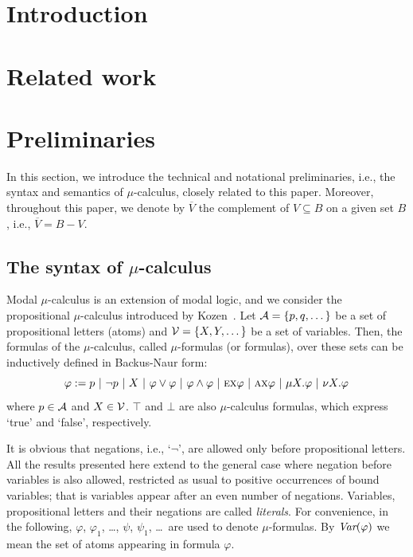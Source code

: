 \documentclass[runningheads]{llncs}
\begin{document}
\section{Introduction}


\section{Related work}

\section{Preliminaries}  \label{preliminaries}
In this section, we introduce the technical and notational preliminaries, i.e., the  syntax and semantics of $\mu$-calculus, closely related to this paper.
Moreover, throughout this paper, we denote by $\overline V$ the complement of $V \subseteq B$ on a given set $B$, i.e., $\overline V = B -V$.

\subsection{The syntax of $\mu$-calculus}\label{mu-suntax}
Modal $\mu$-calculus is an extension of modal logic, and we consider the propositional $\mu$-calculus introduced by Kozen~\cite{DBLP:journals/cacm/Kozen83}.
Let ${\cal A}=\{p,q,\dots\}$ be a set of propositional letters (atoms) and ${\cal V}=\{X, Y, \dots\}$ be a set of variables.
Then, the formulas of the $\mu$-calculus, called $\mu$-formulas (or formulas), over these sets can be inductively defined in Backus-Naur form:
\[
\varphi := p\ |\ \neg p\ |\ X\ |\ \varphi \vee \varphi\ |\ \varphi \wedge \varphi \ |\ \EXIST\NEXT \varphi\ |\ \ALL\NEXT \varphi\ |\ \mu X. \varphi\ |\ \nu X. \varphi
\]
where $p\in {\cal A}$ and $X\in {\cal V}$. $\top$ and $\bot$ are also $\mu$-calculus formulas, which express `true' and `false', respectively.

It is obvious that negations, i.e., `$\neg$', are allowed only before propositional letters.
All the results
presented here extend to the general case where negation before variables is also
allowed, restricted as usual to positive occurrences of bound variables; that is variables appear after an even number of negations.
Variables, propositional letters and their negations are called \emph{literals}.
For convenience, in the following, $\varphi$, $\varphi_1$, \dots, $\psi$, $\psi_1$, \dots\ are used to denote $\mu$-formulas.
By $\textit{Var}(\varphi)$ we mean the set of atoms appearing in formula $\varphi$.
\end{document}
